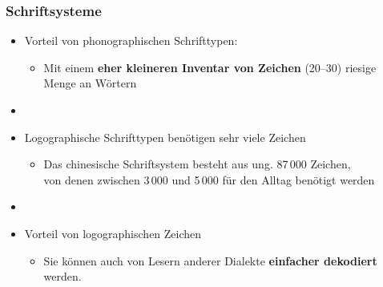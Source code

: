 \begin{frame}
\frametitle{Schriftsysteme}

\begin{itemize}
	\item Vorteil von phonographischen Schrifttypen:
	
	\begin{itemize}
		\item Mit einem \textbf{eher kleineren Inventar von Zeichen} (20--30) \ras riesige Menge an Wörtern
	\end{itemize}
	
	\item[]
	\item Logographische Schrifttypen benötigen sehr viele Zeichen
	
	\begin{itemize}
		\item Das chinesische Schriftsystem besteht aus ung. 87\,000 Zeichen,\\
                  von denen zwischen 3\,000 und 5\,000 für den Alltag benötigt werden
	\end{itemize}
	
	\item[]
	\item Vorteil von logographischen Zeichen
	\begin{itemize}
		\item Sie können auch von Lesern anderer Dialekte \textbf{einfacher dekodiert} werden.
	\end{itemize}	
\end{itemize}
\end{frame}



